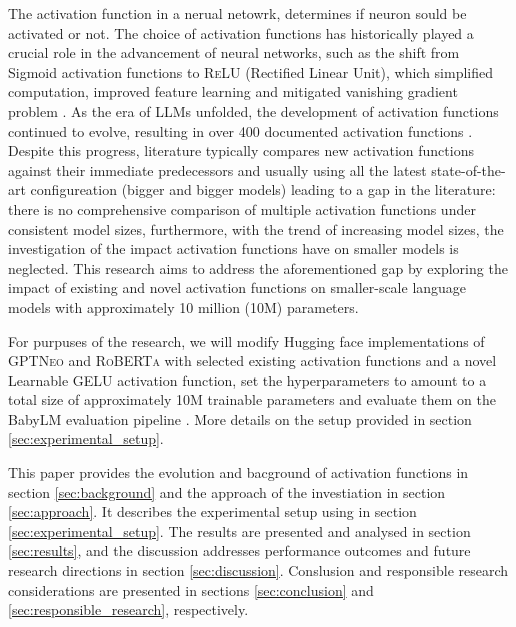 The activation function in a nerual netowrk, determines if neuron sould be activated or not. The choice of activation functions has historically played a crucial role in the advancement of neural networks, such as the shift from Sigmoid activation functions to \textsc{ReLU} (Rectified Linear Unit), which simplified computation, improved feature learning and mitigated vanishing gradient problem \cite{nair2010rectified}. As the era of LLMs unfolded, the development of activation functions continued to evolve, resulting in over 400 documented activation functions \cite{Kunc2024}. Despite this progress, literature typically compares new activation functions against their immediate predecessors and usually using all the latest state-of-the-art configureation (bigger and bigger models) leading to a gap in the literature: there is no comprehensive comparison of multiple activation functions under consistent model sizes, furthermore, with the trend of increasing model sizes, the investigation of the impact activation functions have on smaller models is neglected. This research aims to address the aforementioned gap by exploring the impact of existing and novel activation functions on smaller-scale language models with approximately 10 million (10M) parameters. 

For purpuses of the research, we will modify Hugging face implementations of \textsc{GPTNeo} \cite{huggingfaceNEO} and \textsc{RoBERTa} \cite{huggingfaceRoberta} with selected existing activation functions and a novel Learnable GELU activation function, set the hyperparameters to amount to a total size of approximately 10M trainable parameters and evaluate them on the BabyLM evaluation pipeline \cite{Warstadt2023}. More details on the setup provided in section \ref{sec:experimental_setup}.

This paper provides the evolution and bacground of activation functions in section \ref{sec:background} and the approach of the investiation in section \ref{sec:approach}. It describes the experimental setup using in section \ref{sec:experimental_setup}. The results are presented and analysed in section \ref{sec:results}, and the discussion addresses performance outcomes and future research directions in section \ref{sec:discussion}. Conslusion and responsible research considerations are presented in sections \ref{sec:conclusion} and \ref{sec:responsible_research}, respectively.